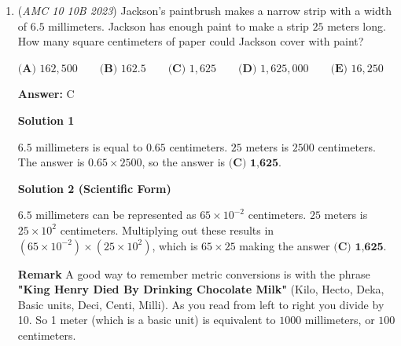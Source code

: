 \begin{enumerate}
\textbf{Solution 2}

Since the arc angle of the diameter of a circle is $90$ degrees, the hypotenuse of each these two triangles is respectively the diameter of circles $A$ and $B$. 

 Therefore the ratio of the areas equals the radius of circle $A$ squared : the radius of circle $B$ squared$=$ $0.5\times$ the diameter of circle $A$, squared : $0.5\times$ the diameter of circle $B$, squared$=$ the diameter of circle $A$, squared: the diameter of circle $B$, squared $=\boxed{\textbf{(D) }\frac{25}{169}}.$




\textbf{Solution 3}

The ratio of areas of circles is the same as the ratios of the diameters squared (since they are similar figures). Since this is a right triangle the hypotenuse of each triangle will be the diameter of the circle. This yields the expression $\frac{5^2}{13^2} =\boxed{\textbf{(D) }\frac{25}{169}}.$



	\item (\textit{AMC 10 10B 2023}) Jackson's paintbrush makes a narrow strip with a width of $6.5$ millimeters. Jackson has enough paint to make a strip $25$ meters long. How many square centimeters of paper could Jackson cover with paint?


 $\textbf{(A) }162{,}500\qquad\textbf{(B) }162.5\qquad\textbf{(C) }1{,}625\qquad\textbf{(D) }1{,}625{,}000\qquad\textbf{(E) }16{,}250$

 \textbf{Answer: }C



\textbf{Solution 1}

$6.5$ millimeters is equal to $0.65$ centimeters. $25$ meters is $2500$ centimeters. The answer is $0.65 \times 2500$, so the answer is $\boxed{\textbf{(C) 1,625}}$. 

 



\textbf{Solution 2 (Scientific Form)}

$6.5$ millimeters can be represented as $65 \times 10^{-2}$ centimeters. $25$ meters is $25 \times 10^{2}$ centimeters. Multiplying out these results in $(65 \times 10^{-2}) \times (25 \times 10^{2})$, which is $65 \times 25$ making the answer $\boxed{\textbf{(C) 1,625}}$.

 \textbf{Remark} A good way to remember metric conversions is with the phrase \textbf{ "King Henry Died By Drinking Chocolate Milk" } (Kilo, Hecto, Deka, Basic units, Deci, Centi, Milli). As you read from left to right you divide by 10. So 1 meter (which is a basic unit) is equivalent to $1000$ millimeters, or $100$ centimeters. 


\end{enumerate}
